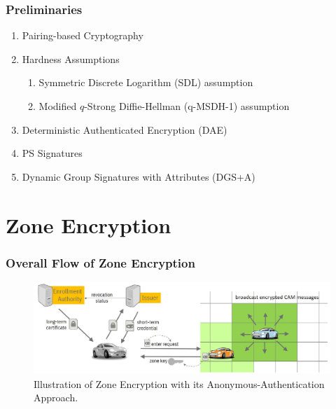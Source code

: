 \documentclass{beamer}
\begin{document}
    \begin{frame}
        \frametitle{Preliminaries}
        \begin{enumerate}
            \item Pairing-based Cryptography
            \item Hardness Assumptions
            \begin{enumerate}
                \item Symmetric Discrete Logarithm (SDL) assumption
                \item Modified \(q\)-Strong Diffie-Hellman (q-MSDH-1) assumption
            \end{enumerate}
            \item Deterministic Authenticated Encryption (DAE)
            \item PS Signatures
            \item Dynamic Group Signatures with Attributes (DGS+A)
        \end{enumerate}
    \end{frame}

    \section{Zone Encryption}
    \begin{frame}
        \frametitle{Overall Flow of Zone Encryption}
        \begin{figure}[!ht]
            \centering
            \includegraphics[width=\textwidth]{figs/ze_flow.png}
            \caption{Illustration of Zone Encryption with its Anonymous-Authentication Approach.}
        \end{figure}
    \end{frame}
\end{document}
